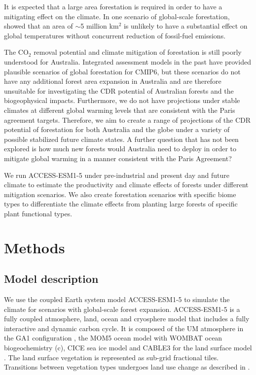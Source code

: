 \documentclass[]{article}
\begin{document}
It is expected that a large area forestation is required in order to have a mitigating effect on the climate.
In one scenario of global-scale forestation, \cite{loughran_limited_2023} showed that an area of $\sim$5 million km$^2$ is unlikely to have a substantial effect on global temperatures without concurrent reduction of fossil-fuel emissions.

The CO$_2$ removal potential and climate mitigation of forestation is still poorly understood for Australia.
Integrated assessment models in the past have provided plausible scenarios of global forestation for CMIP6, but these scenarios do not have any additional forest area expansion in Australia \parencite{loughran_limited_2023} and are therefore unsuitable for investigating the CDR potential of Australian forests and the biogeophysical impacts.
Furthermore, we do not have projections under stable climates at different global warming levels that are consistent with the Paris agreement targets.
Therefore, we aim to create a range of projections of the CDR potential of forestation for both Australia and the globe under a variety of possible stabilized future climate states.
A further question that has not been explored is how much new forests would Australia need to deploy in order to mitigate global warming in a manner consistent with the Paris Agreement?

We run ACCESS-ESM1-5 under pre-industrial and present day and future climate to estimate the productivity and climate effects of forests under different mitigation scenarios.
We also create forestation scenarios with specific biome types to differentiate the climate effects from planting large forests of specific plant functional types.

\section{Methods}

\subsection{Model description}

We use the coupled Earth system model ACCESS-ESM1-5 to simulate the climate for scenarios with global-scale forest expansion.
ACCESS-ESM1-5 is a fully coupled atmosphere, land, ocean and cryosphere model that includes a fully interactive and dynamic carbon cycle.
It is composed of the UM atmosphere in the GA1 configuration \parencite{martin_analysis_2010}, the MOM5 ocean model \parencite{griffies_elements_2012} with WOMBAT ocean biogeochemistry (c), CICE sea ice model \parencite{hunke_cice_nodate} and CABLE3 for the land surface model \parencite{law_carbon_2017}.
The land surface vegetation is represented as sub-grid fractional tiles.
Transitions between vegetation types undergoes land use change as described in \cite{ziehn_australian_2020}.
\end{document}
